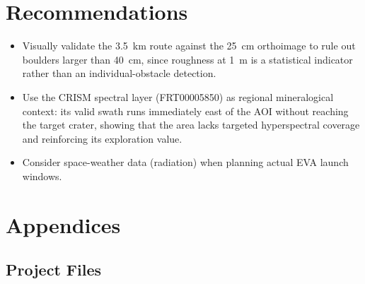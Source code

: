 \documentclass{article}
\begin{document}
\section*{Recommendations}

\begin{itemize}
    \item Visually validate the 3.5~km route against the 25~cm orthoimage to rule out boulders larger than 40~cm, since roughness at 1~m is a statistical indicator rather than an individual-obstacle detection.
    \item Use the CRISM spectral layer (FRT00005850) as regional mineralogical context: its valid swath runs immediately east of the AOI without reaching the target crater, showing that the area lacks targeted hyperspectral coverage and reinforcing its exploration value.
    \item Consider space-weather data (radiation) when planning actual EVA launch windows.
\end{itemize}

\newpage

\appendix
\section{Appendices}

\subsection{Project Files}
\end{document}
